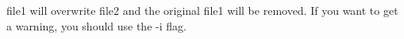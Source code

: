 file1 will overwrite file2 and the original file1 will be removed.
If you want to get a warning, you should use the -i flag.
